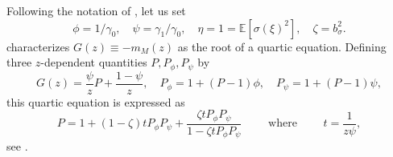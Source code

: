 \documentclass{article}
\theoremstyle{definition}
\newcommand{\E}{\mathbb{E}}
\newcommand{\1}{\mathbf{1}}
\begin{document}
Following the notation of \cite{pennington2017nonlinear}, let us set
\begin{equation}\label{eq:PWCKnotation}
\phi=1/\gamma_0,\quad \psi=\gamma_1/\gamma_0,
\quad \eta=1=\E[\sigma(\xi)^2], \quad \zeta=b_\sigma^2.
\end{equation}
\cite[Theorem 1]{pennington2017nonlinear} characterizes $G(z) \equiv -m_M(z)$
as the root of a
quartic equation. Defining three $z$-dependent quantities
$P,P_\phi,P_\psi$ by
\begin{equation}\label{eq:Pequations}
G(z)=\frac{\psi}{z}P+\frac{1-\psi}{z},
\quad P_\phi=1+(P-1)\phi, \quad P_\psi=1+(P-1)\psi,
\end{equation}
this quartic equation is expressed as
\begin{equation}\label{eq:quarticP}
P=1+(1-\zeta)tP_\phi P_\psi+\frac{\zeta tP_\phi P_\psi}{1-\zeta tP_\phi P_\psi} \qquad \text{ where } \qquad t=\frac{1}{z\psi},
\end{equation}
see \cite[Equations (10--12)]{pennington2017nonlinear}.
\end{document}
